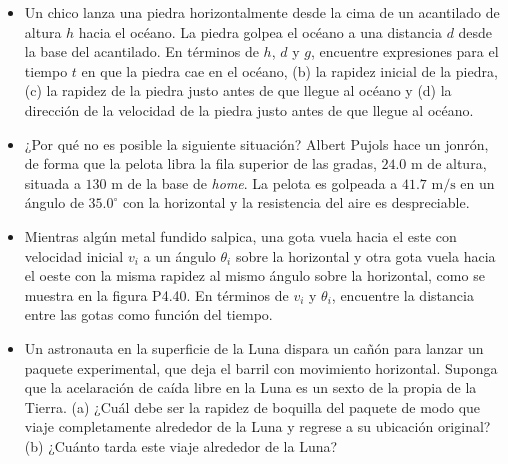 \documentclass[11pt,a4paper]{article}
\begin{document}
\begin{itemize}
    \item[\textbf{38.}] Un chico lanza una piedra horizontalmente desde la cima de un acantilado de altura $h$ hacia el océano. La piedra golpea el océano a una distancia $d$ desde la base del acantilado. En términos de $h$, $d$ y $g$, encuentre expresiones para el tiempo $t$ en que la piedra cae en el océano, (b) la rapidez inicial de la piedra, (c) la rapidez de la piedra justo antes de que llegue al océano y (d) la dirección de la velocidad de la piedra justo antes de que llegue al océano.
    \vspace*{7cm}

    \item[\textbf{39.}] ¿Por qué no es posible la siguiente situación? Albert Pujols hace un jonrón, de forma que la pelota libra la fila superior de las gradas, $24.0 \text{ m}$ de altura, situada a $130 \text{ m}$ de la base de \textit{home}. La pelota es golpeada a $41.7 \text{ m/s}$ en un ángulo de $35.0^\circ$ con la horizontal y la resistencia del aire es despreciable.
    \vspace*{6cm}

    \item[\textbf{40.}] Mientras algún metal fundido salpica, una gota vuela hacia el este con velocidad inicial $v_i$ a un ángulo $\theta_i$ sobre la horizontal y otra gota vuela hacia el oeste con la misma rapidez al mismo ángulo sobre la horizontal, como se muestra en la figura P4.40. En términos de $v_i$ y $\theta_i$, encuentre la distancia entre las gotas como función del tiempo.
    \vspace*{6cm}

    \item[\textbf{41.}] Un astronauta en la superficie de la Luna dispara un cañón para lanzar un paquete experimental, que deja el barril con movimiento horizontal. Suponga que la acelaración de caída libre en la Luna es un sexto de la propia de la Tierra. (a) ¿Cuál debe ser la rapidez de boquilla del paquete de modo que viaje completamente alrededor de la Luna y regrese a su ubicación original? (b) ¿Cuánto tarda este viaje alrededor de la Luna?
    \vspace*{6cm}
\end{itemize}

\newpage
\end{document}

